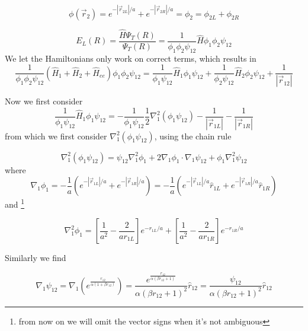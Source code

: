 \documentclass{article}
\begin{document}
\begin{equation}
 \phi(\vec{r}_2) = e^{-|\vec{r}_{2L}|/a} + e^{-|\vec{r}_{2R}|/a} =\phi_2 = \phi_{2L} +\phi_{2R}
\end{equation}

\begin{equation}
 E_L(R)=\frac{\hat{H}\Psi_T(R)}{\Psi_T(R)}=\frac{1}{\phi_1\phi_2\psi_{12}} \hat{H} \phi_1\phi_2\psi_{12}
\end{equation}
We let the Hamiltonians only work on correct terms, which results in
\begin{equation}
 \frac{1}{\phi_1\phi_2\psi_{12}}(\hat{H}_1 + \hat{H}_2 + \hat{H}_{ee})\phi_1\phi_2\psi_{12}=\frac{1}{\phi_1\psi_{12}}\hat{H}_1 \phi_1\psi_{12} + \frac{1}{\phi_2\psi_{12}}\hat{H}_2 \phi_2\psi_{12} + \frac{1}{|\vec{r}_{12}|}
\end{equation}

Now we first consider
\begin{equation}
 \frac{1}{\phi_1\psi_{12}}\hat{H}_1 \phi_1\psi_{12} = - \frac{1}{\phi_1\psi_{12}} \frac12 \nabla_1^2(\phi_1\psi_{12}) - \frac{1}{|\vec{r}_{1L}|} -\frac{1}{|\vec{r}_{1R}|}
\end{equation}
from which we first consider $\nabla_1^2(\phi_1\psi_{12})$, using the chain rule 

\begin{equation}
\label{master}
\nabla_1^2(\phi_1\psi_{12}) = \psi_{12}\nabla_1^2\phi_1 + 2 \nabla_1\phi_1 \cdot \nabla_1  \psi_{12} + \phi_1\nabla_1^2\psi_{12}
\end{equation}
where
\begin{equation}
\label{no1}
 \nabla_1\phi_1 =-\frac1a \left( e^{-|\vec{r}_{1L}|/a} + e^{-|\vec{r}_{1R}|/a} \right)=-\frac1a \left(  e^{-|\vec{r}_{1L}|/a}\hat{r}_{1L} +e^{-|\vec{r}_{1R}|/a}\hat{r}_{1R} \right)
\end{equation}
and \footnote{from now on we will omit the vector signs when it's not ambiguous}

\begin{equation}
\label{no2}
 \nabla_1^2\phi_1 =  \left[\frac{1}{a^2}-\frac{2}{a{r}_{1L}} \right] e^{-{r}_{1L}/a} + \left[\frac{1}{a^2}-\frac{2}{a{r}_{1R}} \right] e^{-{r}_{1R}/a} 
\end{equation}

Similarly we find

\begin{equation}
\label{no3}
 \nabla_1 \psi_{12}= \nabla_1 \left( e^{\frac{{r}_{12} }{\alpha(1+\beta {r}_{12})} } \right) = \frac{e^{\frac{r_{12}}{\alpha (\beta r_{12}+1)}}}{\alpha (\beta r_{12}+1)^2}\hat{r}_{12}=\frac{\psi_{12}}{\alpha (\beta r_{12}+1)^2}\hat{r}_{12}
\end{equation}
\end{document}
